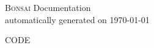 \documentclass{article}
\begin{document}
    \begin{center}
        \LARGE
        \textsc{Bonsai} Documentation \\ 
        \vspace{0.1cm}
        \large
        automatically generated on \today
    \end{center}

    CODE
\end{document}
